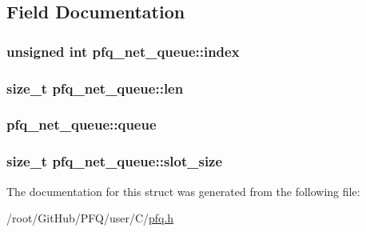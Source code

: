 \subsection{Field Documentation}
\hypertarget{structpfq__net__queue_af66bc8d91f38d0d6c218c9bae8081185}{
\subsubsection[{index}]{\setlength{\rightskip}{0pt plus 5cm}unsigned int pfq\-\_\-net\-\_\-queue\-::index}}\label{structpfq__net__queue_af66bc8d91f38d0d6c218c9bae8081185}
\hypertarget{structpfq__net__queue_a4b511d3c1dbd8d9ed36008500bd44350}{
\subsubsection[{len}]{\setlength{\rightskip}{0pt plus 5cm}size\-\_\-t pfq\-\_\-net\-\_\-queue\-::len}}\label{structpfq__net__queue_a4b511d3c1dbd8d9ed36008500bd44350}
\hypertarget{structpfq__net__queue_a4858e72d7edbe741638986afc0ba9282}{
\subsubsection[{queue}]{ pfq\-\_\-net\-\_\-queue\-::queue}}\label{structpfq__net__queue_a4858e72d7edbe741638986afc0ba9282}
\hypertarget{structpfq__net__queue_ad15e389ac5a91523cccb571c094d3f4e}{
\subsubsection[{slot\-\_\-size}]{\setlength{\rightskip}{0pt plus 5cm}size\-\_\-t pfq\-\_\-net\-\_\-queue\-::slot\-\_\-size}}\label{structpfq__net__queue_ad15e389ac5a91523cccb571c094d3f4e}


The documentation for this struct was generated from the following file\-:\begin{DoxyCompactItemize}
\item 
/root/\-Git\-Hub/\-P\-F\-Q/user/\-C/\hyperlink{pfq_8h}{pfq.\-h}\end{DoxyCompactItemize}
